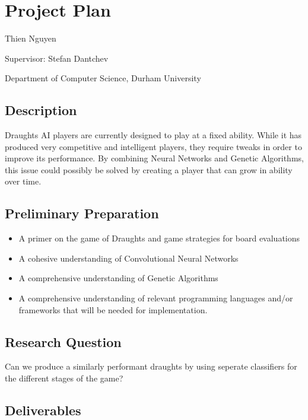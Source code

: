 \hypertarget{project-plan}{%
\section{Project Plan}\label{project-plan}}

Thien Nguyen

Supervisor: Stefan Dantchev

Department of Computer Science, Durham University

\hypertarget{description}{%
\subsection{Description}\label{description}}

Draughts AI players are currently designed to play at a fixed ability.
While it has produced very competitive and intelligent players, they
require tweaks in order to improve its performance. By combining Neural
Networks and Genetic Algorithms, this issue could possibly be solved by
creating a player that can grow in ability over time.

\hypertarget{preliminary-preparation}{%
\subsection{Preliminary Preparation}\label{preliminary-preparation}}

\begin{itemize}
\tightlist
\item
  A primer on the game of Draughts and game strategies for board
  evaluations
\item
  A cohesive understanding of Convolutional Neural Networks
\item
  A comprehensive understanding of Genetic Algorithms
\item
  A comprehensive understanding of relevant programming languages and/or
  frameworks that will be needed for implementation.
\end{itemize}

\hypertarget{research-question}{%
\subsection{Research Question}\label{research-question}}

Can we produce a similarly performant draughts by using seperate
classifiers for the different stages of the game?

\hypertarget{deliverables}{%
\subsection{Deliverables}\label{deliverables}}

